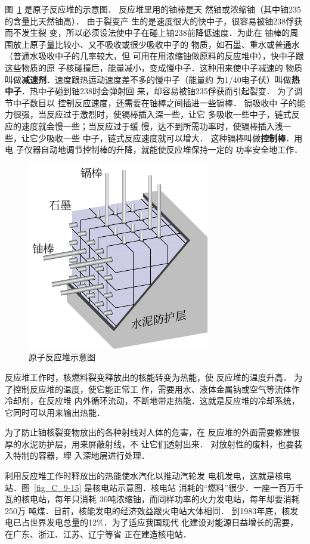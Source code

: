 图~\ref{fig_C_9-14} 是原子反应堆的示意图．
反应堆里用的铀棒是天
然铀或浓缩铀（其中铀235的含量比天然铀高）．
由于裂变产
生的是速度很大的快中子，很容易被铀238俘获而不发生裂
变，所以必须设法使中子在碰上铀238前降低速度．为此在
铀棒的周围放上原子量比较小、又不吸收或很少吸收中子的
物质，如石墨、重水或普通水（普通水吸收中子的几率较大，但
可用在用浓缩铀做原料的反应堆中），快中子跟这些物质的原
子核碰撞后，能量减小，变成慢中子．这种用来使中子减速的
物质叫做\textbf{减速剂}．速度跟热运动速度差不多的慢中子（能量约
为1/40电子伏）叫做\textbf{热中子}．热中子碰到铀238时会弹射回
来，却容易被铀235俘获而引起裂变．
为了调节中子数目以
控制反应速度，还需要在铀棒之间插进一些镉棒．
镉吸收中
子的能力很强，当反应过于激烈时，使镉棒插入深一些，让它
多吸收一些中子，链式反应的速度就会慢一些；当反应过于缓
慢，达不到所需功率时，使镉棒插入浅一些，让它少吸收一些
中子，链式反应速度就可以增大．
这种镉棒叫做\textbf{控制棒}．用电
子仪器自动地调节控制棒的升降，就能使反应堆保持一定的
功率安全地工作．
\begin{figure}[htbp]
	\centering
	\includegraphics{fig/C/9-14.pdf}
	\caption{原子反应堆示意图}\label{fig_C_9-14}
\end{figure}



反应堆工作时，核燃料裂变释放出的核能转变为热能，使
反应堆的温度升高．
为了控制反应堆的温度，使它能正常工
作，需要用水、液体金属钠或空气等流体作冷却剂，在反应堆
内外循环流动，不断地带走热能．这就是反应堆的冷却系统，
它同时可以用来输出热能．

为了防止铀核裂变物放出的各种射线对人体的危害，在
反应堆的外面需要修建很厚的水泥防护层，用来屏蔽射线，不
让它们透射出来．
对放射性的废料，也要装入特制的容器，埋
入深地层进行处理．

利用反应堆工作时释放出的热能使水汽化以推动汽轮发
电机发电，这就是核电站．图~\ref{fig_C_9-15} 是核电站示意图．核电站
消耗的“燃料”很少．一座一百万千瓦的核电站，每年只消耗
30吨浓缩铀，而同样功率的火力发电站，每年却要消耗250万
吨煤．目前，核能发电的经济效益跟火电站大体相同．
到1983年底，核发电已占世界发电总量的12\%．为了适应我国现代
化建设对能源日益增长的需要，在广东、浙江、江苏、辽宁等省
正在建造核电站．

